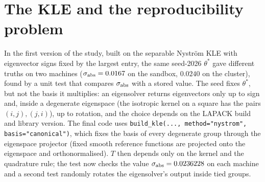 \documentclass[11pt]{article}
\begin{document}
\section{The KLE and the reproducibility problem}\label{sec:kle}
In the first version of the study, built on the separable Nystr\"om KLE with eigenvector signs fixed by the largest entry, the same seed-2026 $\theta^*$ gave different truths on two machines ($\sigma_{\rm abs}=0.0167$ on the sandbox, $0.0240$ on the cluster), found by a unit test that compares $\sigma_{\rm abs}$ with a stored value. The seed fixes $\theta^*$, but not the basis it multiplies: an eigensolver returns eigenvectors only up to sign and, inside a degenerate eigenspace (the isotropic kernel on a square has the pairs $(i,j),(j,i)$), up to rotation, and the choice depends on the LAPACK build and library version. The final code uses \texttt{build\_kle(..., method="nystrom", basis="canonical")}, which fixes the basis of every degenerate group through the eigenspace projector (fixed smooth reference functions are projected onto the eigenspace and orthonormalised). $T$ then depends only on the kernel and the quadrature rule; the test now checks the value $\sigma_{\rm abs}=0.0236228$ on each machine and a second test randomly rotates the eigensolver's output inside tied groups.
\end{document}
